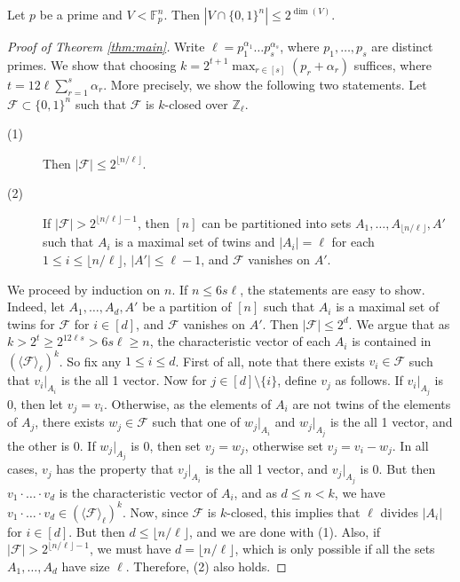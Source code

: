 	\begin{lemma}\label{lemma:odim}
		Let $p$ be a prime and $V< \mathbb{F}_p^{n}$. Then $|V\cap\{0,1\}^{n}|\leq 2^{\dim(V)}$.
	\end{lemma}
	
	\begin{proof}[Proof of Theorem \ref{thm:main}]
		Write $\ell=p_1^{\alpha_1}\dots p_s^{\alpha_s}$, where $p_1,\dots,p_s$ are distinct primes. We show that choosing $k=2^{t+1}\max_{r\in [s]}(p_r+\alpha_r)$ suffices, where $t=12\ell\sum_{r=1}^{s}\alpha_{r}$. More precisely, we show the following two statements. Let $\mathcal{F}\subset \{0,1\}^{n}$ such that $\mathcal{F}$ is $k$-closed over $\mathbb{Z}_{\ell}$.
		\begin{description}
			\item[(1)] Then $|\mathcal{F}|\leq 2^{\lfloor n/\ell\rfloor}$.
			\item[(2)] If $|\mathcal{F}|>2^{\lfloor n/\ell\rfloor-1}$, then $[n]$ can be partitioned into sets $A_{1},\dots,A_{\lfloor n/\ell\rfloor},A'$ such that $A_{i}$ is a maximal set of twins and $|A_i| = \ell$ for each $1 \leq i \leq \lfloor n/\ell\rfloor$, $|A'|\leq \ell-1$, and $\mathcal{F}$ vanishes on $A'$.
		\end{description}
		
		
		
		We proceed by induction on $n$. If $n\leq 6s\ell$, the statements are easy to show. Indeed, let $A_1,\dots,A_d,A'$ be a partition of $[n]$ such that $A_{i}$ is a maximal set of twins for $\mathcal{F}$ for $i\in [d]$, and $\mathcal{F}$ vanishes on $A'$. Then $|\mathcal{F}|\leq 2^{d}$. We argue that as $k>2^{t}\geq 2^{12\ell s}> 6s\ell\geq n$, the  characteristic vector of each $A_{i}$ is contained in $(\langle \mathcal{F} \rangle_{\ell})^{k}$. So fix any $1 \leq i \leq d$. First of all, note that there exists  $v_i\in\mathcal{F}$ such that $v_{i}|_{A_i}$ is the all 1 vector. Now for $j\in [d]\setminus \{i\}$, define $v_j$ as follows. 
		If $v_{i}|_{A_j}$ is 0, then let $v_j=v_i$. Otherwise, as the elements of $A_i$ are not twins of the elements of $A_j$, there exists $w_{j}\in\mathcal{F}$ such that one of $w_j|_{A_{i}}$ and $w_{j}|_{A_{j}}$ is the all 1 vector, and the other is 0. If $w_{j}|_{A_j}$ is 0, then set $v_j=w_j$, otherwise set $v_j=v_i-w_j$. In all cases, $v_j$ has the property that $v_{j}|_{A_i}$ is the all 1 vector, and $v_{j}|_{A_j}$ is 0. But then $v_1\cdot \dotsc \cdot v_{d}$ is the characteristic vector of $A_i$, and as $d\leq n<k$, we have $v_1\cdot\dotsc\cdot v_d\in (\langle \mathcal{F} \rangle_{\ell})^{k}$. Now, since $\mathcal{F}$ is $k$-closed, this implies that $\ell$ divides $|A_{i}|$ for $i\in [d]$. But then $d\leq \lfloor n/\ell\rfloor$, and we are done with (1). Also, if $|\mathcal{F}|>2^{\lfloor n/\ell\rfloor-1}$, we must have $d=\lfloor n/\ell\rfloor$, which is only possible if all the sets $A_1,\dots,A_d$ have size $\ell$. Therefore, (2) also holds.
		

\end{proof}
